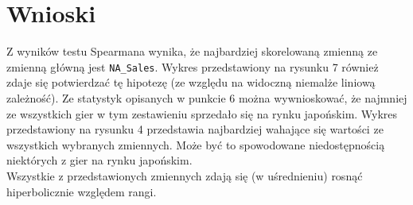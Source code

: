 \section{Wnioski}
	Z wyników testu Spearmana wynika, że najbardziej skorelowaną zmienną ze zmienną główną jest \texttt{NA\_Sales}. Wykres przedstawiony na rysunku 7 również zdaje się potwierdzać tę hipotezę (ze względu na widoczną niemalże liniową zależność). Ze statystyk opisanych w punkcie 6 można wywnioskować, że najmniej ze wszystkich gier w tym zestawieniu sprzedało się na rynku japońskim. Wykres przedstawiony na rysunku 4 przedstawia najbardziej wahające się wartości ze wszystkich wybranych zmiennych. Może być to spowodowane niedostępnością niektórych z gier na rynku japońskim.\\
	Wszystkie z przedstawionych zmiennych zdają się (w uśrednieniu) rosnąć hiperbolicznie względem rangi.
	
